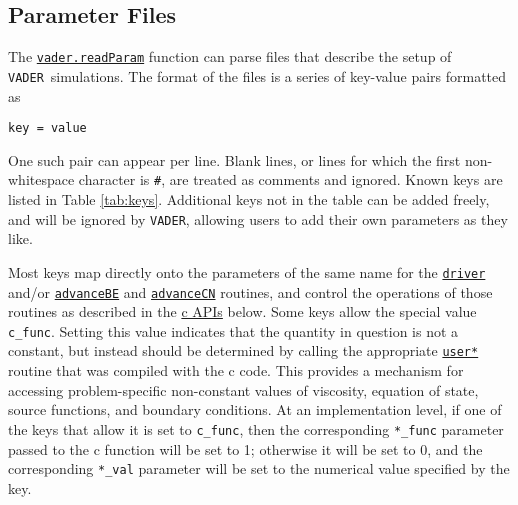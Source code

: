 \documentclass[12pt]{article}
\newcommand{\vader}{\texttt{VADER}}
\begin{document}
\subsection{Parameter Files}
\label{ssec:paramFiles}

The \hyperref[sssec:vader.readParam]{\texttt{vader.readParam}} function can parse files that describe the setup of \vader\ simulations. The format of the files is a series of key-value pairs formatted as
\begin{verbatim}
key = value
\end{verbatim}
One such pair can appear per line. Blank lines, or lines for which the first non-whitespace character is \verb=#=, are treated as comments and ignored. Known keys are listed in Table \ref{tab:keys}. Additional keys not in the table can be added freely, and will be ignored by \vader, allowing users to add their own parameters as they like.

Most keys map directly onto the parameters of the same name for the \hyperref[sssec:driver]{\texttt{driver}} and/or \hyperref[sssec:advanceBE]{\texttt{advanceBE}} and \hyperref[sssec:advanceCN]{\texttt{advanceCN}} routines, and control the operations of those routines as described in the \hyperref[ssec:cAPI]{c APIs} below. Some keys allow the special value \verb=c_func=. Setting this value indicates that the quantity in question is not a constant, but instead should be determined by calling the appropriate \hyperref[ssec:userFunc]{\texttt{user*}} routine that was compiled with the c code. This provides a mechanism for accessing problem-specific non-constant values of viscosity, equation of state, source functions, and boundary conditions. At an implementation level, if one of the keys that allow it is set to \verb=c_func=, then the corresponding \verb=*_func= parameter passed to the c function will be set to 1; otherwise it will be set to 0, and the corresponding \verb=*_val= parameter will be set to the numerical value specified by the key.
\end{document}

